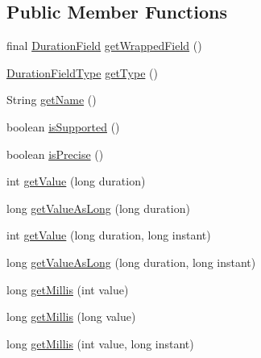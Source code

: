 \subsection*{Public Member Functions}
\begin{DoxyCompactItemize}
\item 
final \hyperlink{classorg_1_1joda_1_1time_1_1_duration_field}{Duration\-Field} \hyperlink{classorg_1_1joda_1_1time_1_1field_1_1_delegated_duration_field_a49abca2fce6d15d437508b9cb0c18b4c}{get\-Wrapped\-Field} ()
\item 
\hyperlink{classorg_1_1joda_1_1time_1_1_duration_field_type}{Duration\-Field\-Type} \hyperlink{classorg_1_1joda_1_1time_1_1field_1_1_delegated_duration_field_a2d97ebc4d88f33289c958c62d4605433}{get\-Type} ()
\item 
String \hyperlink{classorg_1_1joda_1_1time_1_1field_1_1_delegated_duration_field_ae0851dced375289c13602a5a2977c198}{get\-Name} ()
\item 
boolean \hyperlink{classorg_1_1joda_1_1time_1_1field_1_1_delegated_duration_field_a8ecbe4b7aa07ccc1af1a4c44a135ea0c}{is\-Supported} ()
\item 
boolean \hyperlink{classorg_1_1joda_1_1time_1_1field_1_1_delegated_duration_field_a7a50ff57105876f7dcc5e6a83b99ca5c}{is\-Precise} ()
\item 
int \hyperlink{classorg_1_1joda_1_1time_1_1field_1_1_delegated_duration_field_a86f56be6700867889965589876af953c}{get\-Value} (long duration)
\item 
long \hyperlink{classorg_1_1joda_1_1time_1_1field_1_1_delegated_duration_field_a4f7b80931848e313023e37019a0680cb}{get\-Value\-As\-Long} (long duration)
\item 
int \hyperlink{classorg_1_1joda_1_1time_1_1field_1_1_delegated_duration_field_a3fdde744b4156a08cb899ea25884d8f0}{get\-Value} (long duration, long instant)
\item 
long \hyperlink{classorg_1_1joda_1_1time_1_1field_1_1_delegated_duration_field_a9ac37092b870c439222a46fcebce4f31}{get\-Value\-As\-Long} (long duration, long instant)
\item 
long \hyperlink{classorg_1_1joda_1_1time_1_1field_1_1_delegated_duration_field_ae88971abcb1d3bc14f8c0ff62e126647}{get\-Millis} (int value)
\item 
long \hyperlink{classorg_1_1joda_1_1time_1_1field_1_1_delegated_duration_field_ae65b66abcd512273337a010a9790287c}{get\-Millis} (long value)
\item 
long \hyperlink{classorg_1_1joda_1_1time_1_1field_1_1_delegated_duration_field_ab40a35ce219ed6e7f1b653eecfd54814}{get\-Millis} (int value, long instant)

\end{DoxyCompactItemize}
